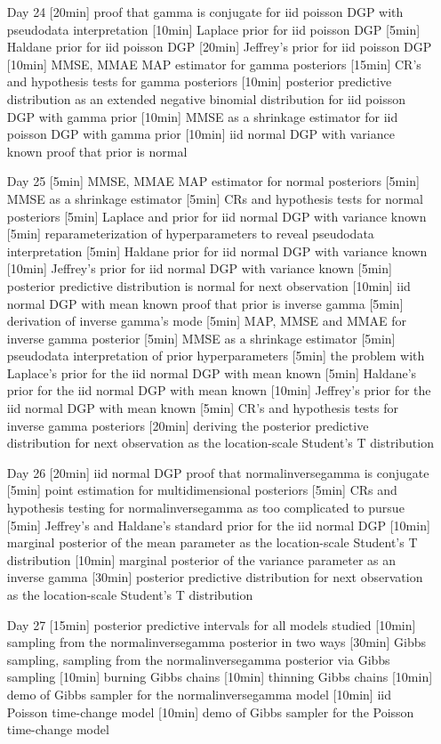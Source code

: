 \begin{enumerate}
\item[Day 24] [20min] proof that gamma is conjugate for iid poisson DGP with pseudodata interpretation [10min] Laplace prior for iid poisson DGP [5min] Haldane prior for iid poisson DGP  [20min] Jeffrey's prior for iid poisson DGP [10min] MMSE, MMAE MAP estimator for gamma posteriors [15min] CR's and hypothesis tests for gamma posteriors [10min] posterior predictive distribution as an extended negative binomial distribution for iid poisson DGP with gamma prior [10min] MMSE as a shrinkage estimator for iid poisson DGP with gamma prior [10min] iid normal DGP with variance known proof that prior is normal 

\item[Day 25] [5min] MMSE, MMAE MAP estimator for normal posteriors [5min] MMSE as a shrinkage estimator [5min] CRs and hypothesis tests for normal posteriors  [5min] Laplace and  prior for iid normal DGP with variance known [5min] reparameterization of hyperparameters to reveal pseudodata interpretation [5min] Haldane prior for iid normal DGP with variance known [10min] Jeffrey's prior for iid normal DGP with variance known [5min] posterior predictive distribution is normal for next observation [10min] iid normal DGP with mean known proof that prior is inverse gamma [5min] derivation of inverse gamma's mode [5min] MAP, MMSE and MMAE for inverse gamma posterior [5min] MMSE as a shrinkage estimator [5min] pseudodata interpretation of prior hyperparameters [5min] the problem with Laplace's prior for the iid normal DGP with mean known [5min] Haldane's prior for the iid normal DGP with mean known [10min] Jeffrey's prior for the iid normal DGP with mean known [5min] CR's and hypothesis tests for inverse gamma posteriors [20min] deriving the posterior predictive distribution for next observation as the location-scale Student's T distribution

\item[Day 26] [20min] iid normal DGP proof that normalinversegamma is conjugate [5min] point estimation for multidimensional posteriors [5min] CRs and hypothesis testing for normalinversegamma as too complicated to pursue [5min] Jeffrey's and Haldane's standard prior for the iid normal DGP  [10min] marginal posterior of the mean parameter as  the location-scale Student's T distribution [10min] marginal posterior of the variance parameter as an inverse gamma [30min] posterior predictive distribution for next observation as the location-scale Student's T distribution 

\item[Day 27] [15min] posterior predictive intervals for all models studied [10min] sampling from the normalinversegamma posterior in two ways [30min] Gibbs sampling, sampling from the normalinversegamma posterior via Gibbs sampling [10min] burning Gibbs chains [10min] thinning Gibbs chains [10min] demo of Gibbs sampler for the normalinversegamma model [10min] iid Poisson time-change model [10min] demo of Gibbs sampler for the Poisson time-change model


\end{enumerate}
